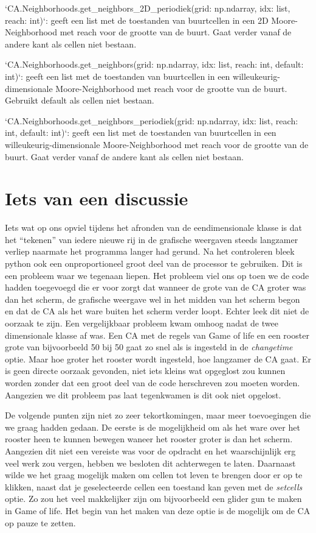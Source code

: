 \documentclass{article}
\begin{document}
\begin{markdown}
`CA.Neighborhoods.get_neighbors_2D_periodiek(grid: np.ndarray, idx: list, reach: int)`: geeft een list met de toestanden van buurtcellen in een 2D Moore-Neighborhood met reach voor de grootte van de buurt. Gaat verder vanaf de andere kant als cellen niet bestaan.

`CA.Neighborhoods.get_neighbors(grid: np.ndarray, idx: list, reach: int, default: int)`: geeft een list met de toestanden van buurtcellen in een willeukeurig-dimensionale Moore-Neighborhood met reach voor de grootte van de buurt. Gebruikt default als cellen niet bestaan.

`CA.Neighborhoods.get_neighbors_periodiek(grid: np.ndarray, idx: list, reach: int, default: int)`: geeft een list met de toestanden van buurtcellen in een willeukeurig-dimensionale Moore-Neighborhood met reach voor de grootte van de buurt. Gaat verder vanaf de andere kant als cellen niet bestaan.
\end{markdown}

\section{Iets van een discussie}
Iets wat op ons opviel tijdens het afronden van de eendimensionale klasse is dat het “tekenen” van iedere nieuwe rij in de grafische weergaven steeds langzamer verliep naarmate het programma langer had gerund. Na het controleren bleek python ook een onproportioneel groot deel van de processor te gebruiken. Dit is een probleem waar we tegenaan liepen. Het probleem viel ons op toen we de code hadden toegevoegd die er voor zorgt dat wanneer de grote van de CA groter was dan het scherm, de grafische weergave wel in het midden van het scherm begon en dat de CA als het ware buiten het scherm verder loopt. Echter leek dit niet de oorzaak te zijn. \newline
Een vergelijkbaar probleem kwam omhoog nadat de twee dimensionale klasse af was. Een CA met de regels van Game of life en een rooster grote van bijvoorbeeld 50 bij 50 gaat zo snel als is ingesteld in de \emph{changetime} optie. Maar hoe groter het rooster wordt ingesteld, hoe langzamer de CA gaat. Er is geen directe oorzaak gevonden, niet iets kleins wat opgeglost zou kunnen worden zonder dat een groot deel van de code herschreven zou moeten worden. Aangezien we dit probleem pas laat tegenkwamen is dit ook niet opgelost.

De volgende punten zijn niet zo zeer tekortkomingen, maar meer toevoegingen die we graag hadden gedaan. \newline
De eerste is de mogelijkheid om als het ware over het rooster heen te kunnen bewegen waneer het rooster groter is dan het scherm. Aangezien dit niet een vereiste was voor de opdracht en het waarschijnlijk erg veel werk zou vergen, hebben we besloten dit achterwegen te laten.\newline
Daarnaast wilde we het graag mogelijk maken om cellen tot leven te brengen door er op te klikken, naast dat je geselecteerde cellen een toestand kan geven met de \emph{setcells} optie. Zo zou het veel makkelijker zijn om bijvoorbeeld een glider gun te maken in Game of life. Het begin van het maken van deze optie is de mogelijk om de CA op pauze te zetten.
\end{document}
